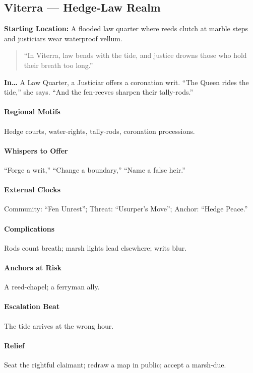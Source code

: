 \subsection*{Viterra — Hedge‑Law Realm}
\textbf{Starting Location:} A flooded law quarter where reeds clutch at marble steps and justiciars wear waterproof vellum.
\begin{quote}
“In Viterra, law bends with the tide, and justice drowns those who hold their breath too long.”
\end{quote}

\textbf{In…} A Law Quarter, a Justiciar offers a coronation writ. ``The Queen rides the tide,'' she says. ``And the fen-reeves sharpen their tally-rods.''
\paragraph{Regional Motifs} Hedge courts, water-rights, tally-rods, coronation processions.
\paragraph{Whispers to Offer} ``Forge a writ,'' ``Change a boundary,'' ``Name a false heir.''
\paragraph{External Clocks} Community: ``Fen Unrest''; Threat: ``Usurper’s Move''; Anchor: ``Hedge Peace.''
\paragraph{Complications} Rods count breath; marsh lights lead elsewhere; writs blur.
\paragraph{Anchors at Risk} A reed-chapel; a ferryman ally.
\paragraph{Escalation Beat} The tide arrives at the wrong hour.
\paragraph{Relief} Seat the rightful claimant; redraw a map in public; accept a marsh-due.
